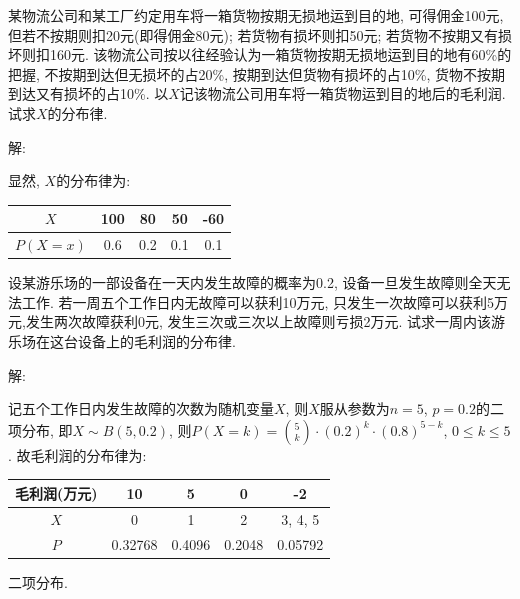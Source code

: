 \documentclass[standard]{ExBook}
\begin{document}
\begin{qitems}
\vspace{-5em}

    \begin{bbox}
    \begin{shaded}
        \qitem
某物流公司和某工厂约定用车将一箱货物按期无损地运到目的地, 可得佣金100元, 但若不按期则扣20元(即得佣金80元); 若货物有损坏则扣50元; 若货物不按期又有损坏则扣160元. 该物流公司按以往经验认为一箱货物按期无损地运到目的地有60\%的把握, 不按期到达但无损坏的占20\%, 按期到达但货物有损坏的占10\%, 货物不按期到达又有损坏的占10\%. 以$X$记该物流公司用车将一箱货物运到目的地后的毛利润. 试求$X$的分布律.
    \end{shaded}
    \end{bbox}

\vspace{-5em}

    \begin{bbox}
解: 

显然, $X$的分布律为: 
\begin{center}
\setlength{\tabcolsep}{38pt}
\begin{tabular}{c|c|c|c|c}
\hline
$X$ & 100 & 80 & 50 & -60 \\
\hline
$P(X=x)$ & 0.6 & 0.2 & 0.1 & 0.1 \\
\hline
\end{tabular}
\end{center}
    \end{bbox}

\vspace{-5em}

    \begin{bbox}
    \begin{shaded}
        \qitem
设某游乐场的一部设备在一天内发生故障的概率为0.2, 设备一旦发生故障则全天无法工作. 若一周五个工作日内无故障可以获利10万元, 只发生一次故障可以获利5万元,发生两次故障获利0元, 发生三次或三次以上故障则亏损2万元. 试求一周内该游乐场在这台设备上的毛利润的分布律.
    \end{shaded}
    \end{bbox}

\vspace{-5em}

    \begin{bbox}
解: 

记五个工作日内发生故障的次数为随机变量$X$, 则$X$服从参数为$n=5$, $p=0.2$的二项分布, 即$X\sim B(5,0.2)$, 则$P(X=k)=\binom{5}{k}\cdot(0.2)^k\cdot(0.8)^{5-k}$, $0 \leq k \leq 5$. 故毛利润的分布律为:
\begin{center}
\setlength{\tabcolsep}{26pt}
\begin{tabular}{c|c|c|c|c}
\hline
毛利润(万元) & 10 & 5 & 0 & -2 \\
\hline
$X$ & 0 & 1 & 2 & 3, 4, 5 \\
\hline
$P$ & 0.32768 & 0.4096 & 0.2048 & 0.05792 \\
\hline
\end{tabular}
\end{center}
\textcolor{themeColor}{\selectfont {} 二项分布.}
    \end{bbox}


\end{qitems}
\end{document}
